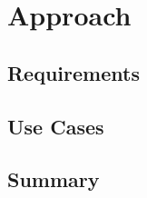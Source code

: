 
\chapter{Approach}\label{chapter:Approach}
\section{Requirements}
\section{Use Cases}





\section{Summary}



